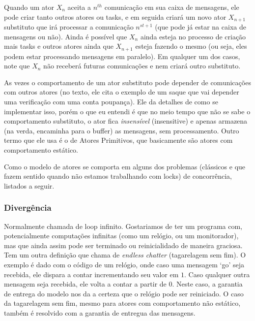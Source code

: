 \documentclass[]{article}
\begin{document}
		\par Quando um ator $X_n$ aceita a $n^{th}$ comunicação em sua caixa de mensagens, ele pode criar tanto outros
		atores ou tasks, e em seguida criará um novo ator $X_{n+1}$ substituto que irá processar a comunicação
		$n^{st+1}$ (que pode já estar na caixa de mensagens ou não). Ainda é possível  que $X_n$ ainda esteja no
		processo de criação mais tasks e outros atores ainda que $X_{n+1}$ esteja fazendo o mesmo (ou seja, eles podem
		estar processando mensagens em paralelo). Em qualquer um dos casos, note que $X_n$ não receberá futuras 
		comunicações e nem criará outro substituto.
		
		\par As vezes o comportamento de um ator substituto pode depender de comunicações com outros atores (no texto,
		ele cita o exemplo de um saque que vai depender uma verificação com uma conta poupança). Ele da detalhes
		de como se implementar isso, porém o que eu entendi é que no meio tempo que não se sabe o comportamento
		substituto, o ator fica \emph{insensível} (insensitive) e apenas armazena (na verda, encaminha para o buffer)
		as mensagens, sem processamento. Outro termo que ele usa é o de Atores Primitivos, que basicamente são atores
		com comportamento estático.

		
		\par Como o modelo de atores se comporta em alguns dos problemas (clássicos e que fazem sentido quando não
		estamos trabalhando com locks) de concorrência, listados a seguir.
		
		\subsubsection{Divergência}
		\par Normalmente chamada de loop infinito. Gostariamos de ter um programa com, potencialmente computações
		infinitas (como um relógio, ou um monitorador), mas que ainda assim pode ser terminado ou reinicialidado de
		maneira graciosa. Tem um outra definição que chama de \textit{endless chatter} (tagarelagem sem fim). O
		exemplo é dado com o código de um relógio, onde caso uma mensagem `go' seja recebida, ele dispara a contar
		incrementando seu valor em $1$. Caso qualquer outra mensagem seja recebida, ele volta a contar a partir de $0$.
		Neste caso, a garantia de entrega do modelo nos da a certeza que o relógio pode ser reiniciado. O caso
		da tagarelagem sem fim, mesmo para atores com comportamento não estático, também é resolvido com a garantia
		de entregua das mensagens.
		
\end{document}
